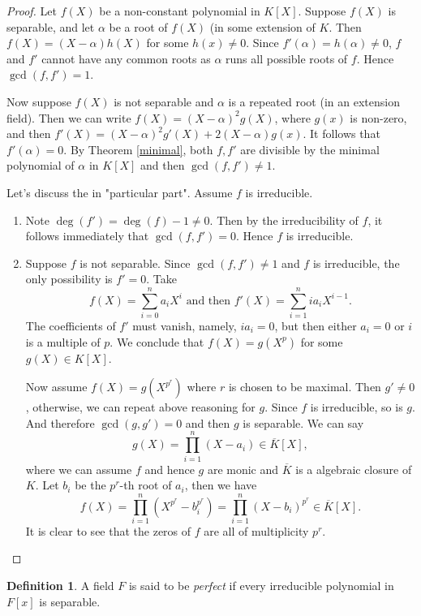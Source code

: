\documentclass[12pt]{report}
\theoremstyle{definition}
\newtheorem{defn}[thm]{Definition}
\def\aa{\alpha}
\begin{document}
\begin{proof}
    Let $f(X)$ be a non-constant polynomial in $K[X]$. Suppose $f(X)$ is separable, and let $\aa$ be a root of $f(X)$ (in some extension of $K$. Then $f(X) = (X -\aa)h(X)$ for some $h(x)\not=0$. Since $f'(\aa)=h(\aa)\not=0$, $f$ and $f'$ cannot have any common roots as $\aa$ runs all possible roots of $f$. Hence $\gcd(f,f')=1$. 

    Now suppose $f(X)$ is not separable and $\aa$ is a repeated root (in an extension field). Then we can write $f(X)=(X-\aa)^2g(X)$, where $g(x)$ is non-zero, and then  $f'(X)= (X-\aa)^2g'(X)+2(X-\aa)g(x)$. It follows that $f'(\aa)=0$. By Theorem \ref{minimal}, both $f,f'$ are divisible by the minimal polynomial of $\aa$ in $K[X]$ and then $\gcd(f,f')\not=1$.
    
    \smallskip

    Let's discuss the in "particular part". Assume $f$ is irreducible.
    \begin{enumerate}
        \item Note $\deg(f')=\deg(f)-1\not=0$. Then by the irreducibility of $f$, it follows immediately that $\gcd(f,f')=0$. Hence $f$ is irreducible.
        \item Suppose $f$ is not separable. Since $\gcd(f,f')\not=1$ and $f$ is irreducible, the only possibility is $f'=0$. Take $$f(X)=\sum_{i=0}^n a_i X^i \mbox{ and then } f'(X)=\sum_{i=1}^n ia_i X^{i-1}.$$ The coefficients of $f'$ must vanish, namely, $ia_i =  0$, but then either $a_i=0$ or $i$ is a multiple of $p$. We conclude that $f(X)=g(X^p)$ for some $g(X)\in K[X]$. 
        
        Now assume $f(X)=g(X^{p^r})$ where $r$ is chosen to be maximal. Then $g'\not=0$, otherwise, we can repeat above reasoning for $g$. Since $f$ is irreducible, so is $g$. And therefore $\gcd(g,g')=0$ and then $g$ is separable. We can say $$g(X)=\prod_{i=1}^n (X-a_i)\in \overline{K}[X],$$ where we can assume $f$ and hence $g$ are monic and $\overline{K}$ is a algebraic closure of $K$.  Let $b_i$ be the $p^r$-th root of $a_i$, then we have $$f(X)=\prod_{i=1}^n (X^{p^r}-b_i^{p^r})=\prod_{i=1}^n (X-b_i)^{p^r}\in \overline{K}[X].$$
        It is clear to see that the zeros of $f$ are all of multiplicity $p^r$.
    \end{enumerate} 
\end{proof}

\begin{defn}
    A field $F$ is said to be \emph{perfect} if every irreducible polynomial in $F[x]$ is separable.
\end{defn}
\end{document}
